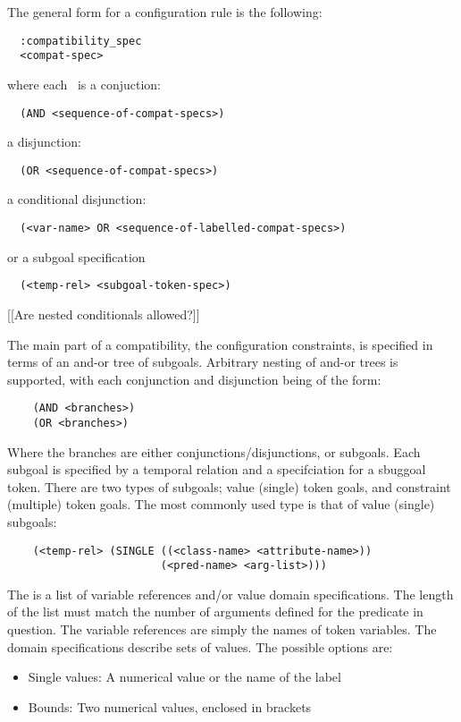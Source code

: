 The general form for a configuration rule is the following:
  \begin{verbatim}
  :compatibility_spec
  <compat-spec> \end{verbatim}
  where each {\tt <compat-spec>}\ is a conjuction:
  \begin{verbatim}
  (AND <sequence-of-compat-specs>)  \end{verbatim}
  a disjunction:
  \begin{verbatim}
  (OR <sequence-of-compat-specs>) \end{verbatim}
  a conditional disjunction:
  \begin{verbatim}
  (<var-name> OR <sequence-of-labelled-compat-specs>) \end{verbatim}
  or a subgoal specification
  \begin{verbatim}
  (<temp-rel> <subgoal-token-spec>) \end{verbatim}

[[Are nested conditionals allowed?]]












The main part of a compatibility, the configuration constraints, is
specified in terms of an and-or tree of subgoals.  Arbitrary nesting
of and-or trees is supported, with each conjunction and disjunction
being of the form:
\begin{verbatim}
    (AND <branches>)
    (OR <branches>)
\end{verbatim}
Where the branches are either conjunctions/disjunctions, or subgoals. 
Each subgoal is specified by a temporal relation and a specifciation
for a sbuggoal token.  There are two types of subgoals; value (single)
token goals, and constraint (multiple) token goals.  The most commonly
used type is that of value (single) subgoals:
\begin{verbatim}
    (<temp-rel> (SINGLE ((<class-name> <attribute-name>))
                        (<pred-name> <arg-list>)))
\end{verbatim}

The {\tt <arg-list>} is a list of variable references and/or value 
domain specifications.  The length of the list must match the number 
of arguments defined for the predicate in question.  The variable 
references are simply the names of token variables.  The domain 
specifications describe sets of values.  The possible options are:
\begin{itemize}
\item Single values:  A numerical value or the name of the label
\item Bounds: Two numerical values, enclosed in brackets
\end{itemize}

